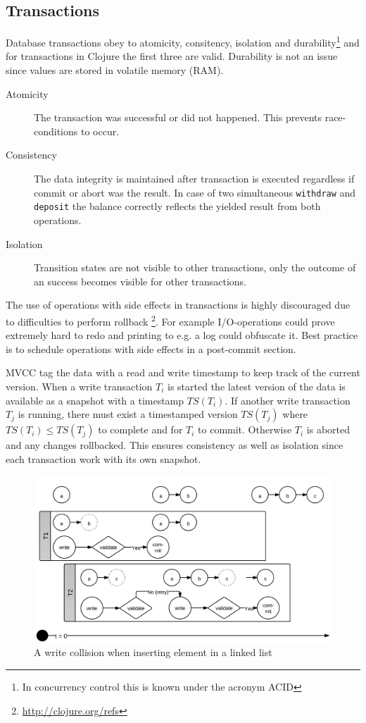 \documentclass[a4paper,12pt]{kth-mag}
\begin{document}
\subsection{Transactions}
Database transactions obey to atomicity, consitency, isolation and durability\footnote{In concurrency control this is known under the acronym ACID} and for transactions in Clojure the first three are valid. Durability is not an issue since values are stored in volatile memory (RAM).

\begin{description}
    \item[Atomicity] The transaction was successful or did not happened. This prevents race-conditions to occur.
    \item[Consistency] The data integrity is maintained after transaction is executed regardless if commit or abort was the result. In case of two simultaneous \texttt{withdraw} and \texttt{deposit} the balance correctly reflects the yielded result from both operations.
    \item[Isolation] Transition states are not visible to other transactions, only the outcome of an success becomes visible for other transactions.
\end{description}

The use of operations with side effects in transactions is highly discouraged due to difficulties to perform rollback \footnote{\url{http://clojure.org/refs}}. For example I/O-operations could prove extremely hard to redo and printing to e.g. a log could obfuscate it. Best practice is to schedule operations with side effects in a post-commit section.

MVCC tag the data with a read and write timestamp to keep track of the current version. When a write transaction $T_i$ is started the latest version of the data is available as a snapshot with a timestamp $TS(T_i)$. If another write transaction $T_j$ is running, there must exist a timestamped version $TS(T_j)$ where $TS(T_i) \le TS(T_j)$ to complete and for $T_i$ to commit. Otherwise $T_i$ is aborted and any changes rollbacked. This ensures consistency as well as isolation since each transaction work with its own snapshot.

\begin{figure}[H]
\centering
\includegraphics[scale=0.8]{images/TransactionWriteCollision.png}
\caption{A write collision when inserting element in a linked list}
\label{fig:twc}
\end{figure}
\end{document}
